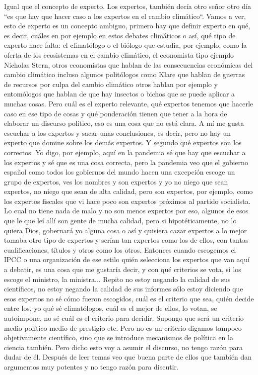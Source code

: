 Igual que el concepto de experto. Los expertos, también decía otro señor otro día ``es que hay que hacer caso a los expertos en el cambio climático``. Vamos a ver, esto de experto es un concepto ambiguo, primero hay que definir experto en qué, es decir, cuáles en por ejemplo en estos debates climáticos o así, qué tipo de experto hace falta: el climatólogo o el biólogo que estudia, por ejemplo, como la oferta de los ecosistemas en el cambio climático, el economista tipo ejemplo Nicholas Stern, otros economistas que hablan de las consecuencias económicas del cambio climático incluso algunos politólogos como Klare que hablan de guerras de recursos por culpa del cambio climático otros hablan por ejemplo y entomólogos que hablan de que hay insectos o bichos que se puede aplicar a muchas cosas. Pero cuál es el experto relevante, qué expertos tenemos que hacerle caso en ese tipo de cosas y qué ponderación tienen que tener a la hora de elaborar un discurso político, eso es una cosa que no está clara. A mí me gusta escuchar a los expertos y sacar unas conclusiones, es decir, pero no hay un experto que domine sobre los demás expertos. Y segundo qué expertos son los correctos. Yo digo, por ejemplo, aquí en la pandemia sé que hay que escuchar a los expertos y sé que es una cosa correcta, pero la pandemia veo que el gobierno español como todos los gobiernos del mundo hacen una excepción escoge un grupo de expertos, ves los nombres y son expertos y yo no niego que sean expertos, no niego que sean de alta calidad, pero son expertos, por ejemplo, como los expertos fiscales que vi hace poco son expertos próximos al partido socialista. Lo cual no tiene nada de malo y no son menos expertos por eso, algunos de esos que le que leí allí son gente de mucha calidad, pero si hipotéticamente, no lo quiera Dios, gobernará yo alguna cosa o así y quisiera cazar expertos a lo mejor tomaba otro tipo de expertos y serían tan expertos como los de ellos, con tantas cualificaciones, títulos y otros como los otros. Entonces cuando escogemos el IPCC o una organización de ese estilo quién selecciona los expertos que van aquí a debatir, es una cosa que me gustaría decir, y con qué criterios se vota, si los escoge el ministro, la ministra... Repito no estoy negando la calidad de sus científicos, no estoy negando la calidad de sus informes sólo estoy diciendo que esos expertos no sé cómo fueron escogidos, cuál es el criterio que sea, quién decide entre los, yo qué sé climatólogos, cuál es el mejor de ellos, lo votan, se autoimpone, no sé cuál es el criterio para decidir. Supongo que será un criterio medio político medio de prestigio etc. Pero no es un criterio digamos tampoco objetivamente científico, sino que se introduce mecanismos de política en la ciencia también. Pero dicho esto voy a asumir el discurso, no tengo razón para dudar de él. Después de leer temas veo que buena parte de ellos que también dan argumentos muy potentes y no tengo razón para discutir.

